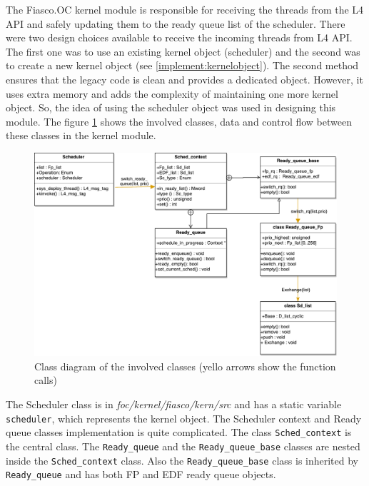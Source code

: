 The Fiasco.OC kernel module is responsible for receiving the threads from the L4 API and safely updating them to the ready queue list of the scheduler. There were two design choices available to receive the incoming threads from L4 API. The first one was to use an existing kernel object (scheduler) and the second was to create a new kernel object (see \ref{implement:kernelobject}). The second method ensures that the legacy code is clean and provides a dedicated object. However, it uses extra memory and adds the complexity of maintaining one more kernel object. So, the idea of using the scheduler object was used in designing this module. The figure \ref{fig:kernel_class} shows the involved classes, data and control flow between these classes in the kernel module.

\begin{figure}[h]
\centering
\includegraphics[width=1.0\linewidth]{figures/kernel_class}
\caption{Class diagram of the involved classes (yello arrows show the function calls)}
\label{fig:kernel_class}
\end{figure}

The Scheduler class is in \textit{foc/kernel/fiasco/kern/src} and has a static variable \texttt{scheduler}, which represents the kernel object. The Scheduler context and Ready queue classes implementation is quite complicated. The class \texttt{Sched\_context} is the central class. The \texttt{Ready\_queue} and the \texttt{Ready\_queue\_base} classes are nested inside the \texttt{Sched\_context} class. Also the \texttt{Ready\_queue\_base} class is inherited by \texttt{Ready\_queue} and has both FP and EDF ready queue objects.


